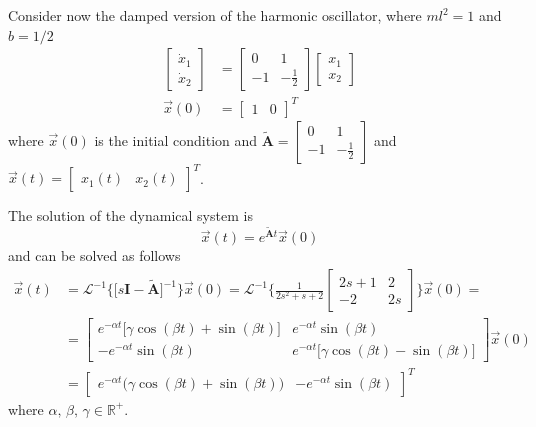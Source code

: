 \documentclass[12pt,a4paper,oneside]{book}
\begin{document}
\begin{onehalfspace}
\begin{example}
Consider now the damped version of the harmonic oscillator, where $ml^2=1$ and 
$b=1/2$
\begin{equation}
	\begin{aligned}
		\begin{bmatrix} \dot{x}_1 \\[6pt] \dot{x}_2 \end{bmatrix} &= 
		\begin{bmatrix} 0 & 1 \\[6pt] -1 & -\frac{1}{2} \end{bmatrix} 
		\begin{bmatrix} {x}_1 \\[6pt] {x}_2 \end{bmatrix} \\[6pt]
		\vec{x}(0) &= \begin{bmatrix} 1 & 0 \end{bmatrix}^T
	\end{aligned}
\end{equation}
where $\vec{x}(0)$ is the initial condition and $\tilde{\mathbf{A}} = 
\begin{bmatrix} 0 
& 1 \\ -1 & -\frac{1}{2} \end{bmatrix}$ and $\vec{x}(t)= \begin{bmatrix} x_1(t) 
& x_2(t) \end{bmatrix}^T$.

The solution of the dynamical system is
\begin{equation}
	\vec{x}(t) = e^{\tilde{\mathbf{A}}t}\vec{x}(0)
\end{equation}
and can be solved as follows
\begin{equation}
	\begin{aligned}
		\vec{x}(t) &= 
		\mathcal{L}^{-1}\Big\{\Big[s\mathbf{I}-\tilde{\mathbf{A}}\Big]^{-1} 
		\Big\}\vec{x}(0) = \mathcal{L}^{-1}\Big\{ \frac{1}{2s^2+s+2} 
		\begin{bmatrix} 2s+1 & 2 \\ -2 & 2s \end{bmatrix}\Big\}\vec{x}(0) = 
		\\[6pt]
		&= \begin{bmatrix} e^{-\alpha t}\Big[\gamma \cos(\beta t)+\sin(\beta t)\Big] & e^{-\alpha t}\sin(\beta t) \\ -e^{-\alpha t}\sin(\beta t) & e^{-\alpha t}\Big[\gamma \cos(\beta t)-\sin(\beta t)\Big] \end{bmatrix}\vec{x}(0) \\[6pt]
		&= \begin{bmatrix} e^{-\alpha t}\Big(\gamma \cos(\beta t)+\sin(\beta t)\Big) & -e^{-\alpha t}\sin(\beta t) \end{bmatrix}^T
	\end{aligned}
\end{equation}
where $\alpha,\,\beta,\,\gamma\in\mathbb{R}^+$.


\end{example}
\end{onehalfspace}
\end{document}
